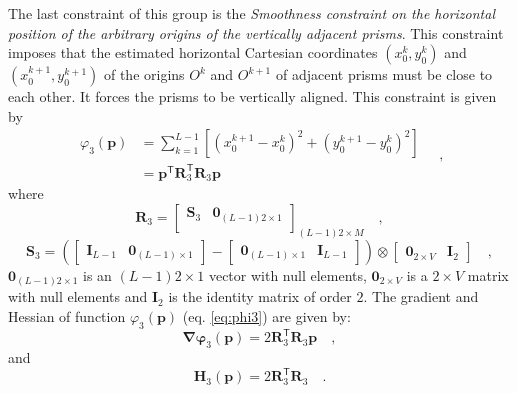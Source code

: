 The last constraint of this group is the \textit{Smoothness constraint on the horizontal position of 
the arbitrary origins of the vertically adjacent prisms}. This constraint imposes that the estimated horizontal 
Cartesian coordinates $(x_{0}^{k}, y_{0}^{k})$ and $(x_{0}^{k+1}, y_{0}^{k+1})$ of the origins $O^{k}$ and $O^{k+1}$ 
of adjacent prisms must be close to each other. It forces the prisms to be vertically aligned. This constraint 
is given by
\begin{equation}\label{eq:phi3}
\begin{split}
\varphi_{3}(\mathbf{p}) &= \sum\limits^{L-1}_{k=1}\left[\left(x_{0}^{k+1} - x_{0}^{k}\right)^2 + \left(y_{0}^{k+1} - y_{0}^{k}\right)^2 \right] \\
&= \mathbf{p}^{\mathsf{T}} \mathbf{R}^{\mathsf{T}}_{3}\mathbf{R}_{3}\mathbf{p}
\end{split} \quad ,
\end{equation}
where 
\begin{equation}
\mathbf{R}_{3} = 
\begin{bmatrix}
\mathbf{S}_{3} & \mathbf{0}_{(L-1)2 \times 1} \\
\end{bmatrix}_{(L-1)2 \times M} \quad ,
\label{eq:R3-matrix}
\end{equation}
\begin{equation}
\mathbf{S}_{3} =
\left( 
\begin{bmatrix} \mathbf{I}_{L-1} & \mathbf{0}_{(L-1) \times 1} \end{bmatrix} -
\begin{bmatrix} \mathbf{0}_{(L-1) \times 1} & \mathbf{I}_{L-1} \end{bmatrix} 
\right) \otimes 
\begin{bmatrix} \mathbf{0}_{2 \times V} & \mathbf{I}_{2} \end{bmatrix} \quad ,
\label{eq:S3-matrix}
\end{equation}
$\mathbf{0}_{(L-1)2 \times 1}$ is an $(L-1)2 \times 1$ vector with null elements,
$\mathbf{0}_{2 \times V}$ is a $2 \times V$ matrix with null elements and 
$\mathbf{I}_{2}$ is the identity matrix of order $2$. The gradient and Hessian of function $\varphi_{3}(\mathbf{p})$ (eq. \ref{eq:phi3}) are given by:
\begin{equation}\label{eq:phi3_grad}
\boldsymbol{\nabla\varphi}_{3}(\mathbf{p}) = 2 \mathbf{R}^{\mathsf{T}}_{3}\mathbf{R}_{3}\mathbf{p} \quad ,
\end{equation}
and
\begin{equation}\label{eq:phi3_hessian}
\mathbf{H}_{3}(\mathbf{p}) = 2 \mathbf{R}^{\mathsf{T}}_{3}\mathbf{R}_{3} \quad .
\end{equation}

